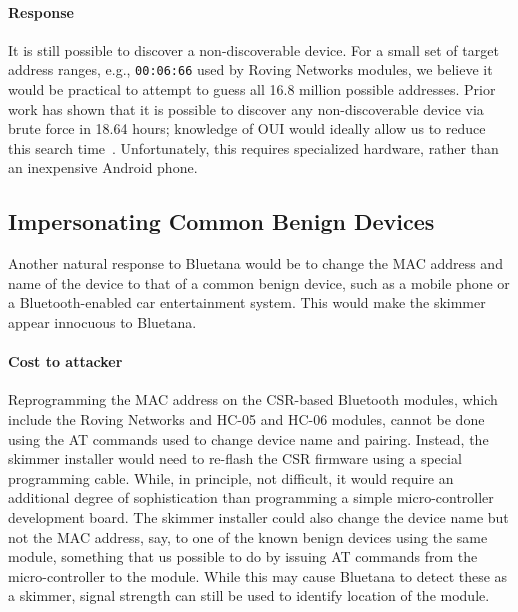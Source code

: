\paragraph{Response} It is still possible to discover a non-discoverable device.
%
For a small set of target address ranges, e.g., \texttt{00:06:66} used by Roving Networks modules, we believe it
would be practical to attempt to guess all 16.8 million possible addresses.
%
Prior work has shown that it is possible to discover any non-discoverable device via brute force in 18.64 hours;
knowledge of OUI would ideally allow us to reduce this search time~\cite{cross2007detecting}.
%
Unfortunately, this requires specialized hardware, rather than an inexpensive Android phone.

\subsection{Impersonating Common Benign Devices}
Another natural response to Bluetana would be to change the MAC address and name of the device to that of a common
benign device, such as a mobile phone or a Bluetooth-enabled car entertainment system. This would make the skimmer
appear innocuous to Bluetana.

\paragraph{Cost to attacker} Reprogramming the MAC address on the CSR-based Bluetooth modules, which include the
Roving Networks and HC-05 and HC-06 modules, cannot be done using the AT commands used to change device name and
pairing. Instead, the skimmer installer would need to re-flash the CSR firmware using a special programming cable.
While, in principle, not difficult, it would require an additional degree of sophistication than programming a simple
micro-controller development board. The skimmer installer could also change the device name but not the MAC address,
say, to one of the known benign devices using the same module, something that us possible to do by issuing AT
commands from the micro-controller to the module. While this may cause Bluetana to detect these as a skimmer, signal strength can still be used to identify location of the module.

